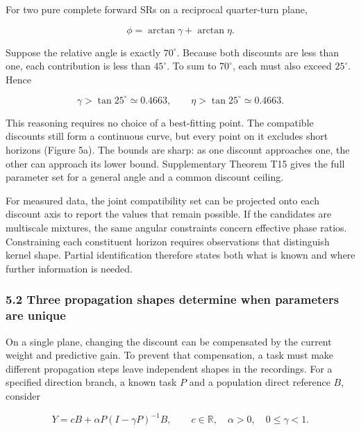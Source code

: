 \documentclass[11pt,a4paper]{article}
\begin{document}
\par
\noindent\begin{minipage}{\linewidth}

For two pure complete forward SRs on a reciprocal quarter-turn plane,

\[
\phi=\arctan\gamma+\arctan\eta.
\]

\end{minipage}\par

\par
\noindent\begin{minipage}{\linewidth}

Suppose the relative angle is exactly \(70^\circ\). Because both
discounts are less than one, each contribution is less than
\(45^\circ\). To sum to \(70^\circ\), each must also exceed
\(25^\circ\). Hence

\[
\gamma>\tan25^\circ\simeq0.4663,
\qquad \eta>\tan25^\circ\simeq0.4663.
\]

\end{minipage}\par

This reasoning requires no choice of a best-fitting point. The
compatible discounts still form a continuous curve, but every point on
it excludes short horizons (Figure 5a). The bounds are sharp: as one
discount approaches one, the other can approach its lower bound.
Supplementary Theorem T15 gives the full parameter set for a general
angle and a common discount ceiling.

For measured data, the joint compatibility set can be projected onto
each discount axis to report the values that remain possible. If the
candidates are multiscale mixtures, the same angular constraints concern
effective phase ratios. Constraining each constituent horizon requires
observations that distinguish kernel shape. Partial identification
therefore states both what is known and where further information is
needed.

\subsubsection{5.2 Three propagation shapes determine when parameters
are
unique}\label{three-propagation-shapes-determine-when-parameters-are-unique}

\par
\noindent\begin{minipage}{\linewidth}

On a single plane, changing the discount can be compensated by the
current weight and predictive gain. To prevent that compensation, a task
must make different propagation steps leave independent shapes in the
recordings. For a specified direction branch, a known task \(P\) and a
population direct reference \(B\), consider

\[
Y=cB+\alpha P(I-\gamma P)^{-1}B,
\qquad c\in\mathbb R,\quad\alpha>0,\quad0\leq\gamma<1.
\]

\end{minipage}\par
\end{document}
